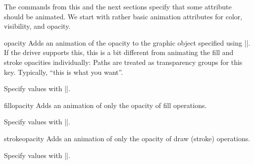 The commands from this and the next sections specify that some attribute should
be animated. We start with rather basic animation attributes for color,
visibility, and opacity.

\begin{sysanimateattribute}{opacity}
    Adds an animation of the opacity to the graphic object specified using
    |\pgfsysanimkeywhom|. If the driver supports this, this is a bit different
    from animating the fill and stroke opacities individually: Paths are
    treated as transparency groups for this key. Typically, ``this is what you
    want''.

    Specify values with |\pgfsysanimvalscalar|.
\begin{codeexample}[
    preamble={\usetikzlibrary{animations}},
    animation list={0.5,1,1.5,2},
]
\end{codeexample}
\end{sysanimateattribute}

\begin{sysanimateattribute}{fillopacity}
    Adds an animation of only the opacity of fill operations.

    Specify values with |\pgfsysanimvalscalar|.
\begin{codeexample}[
    preamble={\usetikzlibrary{animations}},
    animation list={0.5,1,1.5,2},
]
\end{codeexample}
\end{sysanimateattribute}

\begin{sysanimateattribute}{strokeopacity}
    Adds an animation of only the opacity of draw (stroke) operations.

    Specify values with |\pgfsysanimvalscalar|.
\begin{codeexample}[
    preamble={\usetikzlibrary{animations}},
    animation list={0.5,1,1.5,2},
]
\end{codeexample}
\end{sysanimateattribute}

